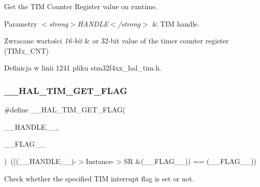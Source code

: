Get the T\+IM Counter Register value on runtime. 


\begin{DoxyParams}{Parametry}
{\em $<$strong$>$\+H\+A\+N\+D\+L\+E$<$/strong$>$} & T\+IM handle. \\
\hline
\end{DoxyParams}

\begin{DoxyRetVals}{Zwracane wartości}
{\em 16-\/bit} & or 32-\/bit value of the timer counter register (T\+I\+Mx\+\_\+\+C\+NT) \\
\hline
\end{DoxyRetVals}


Definicja w linii 1241 pliku stm32f4xx\+\_\+hal\+\_\+tim.\+h.

\mbox{\label{group___t_i_m___exported___macros_ga96d98c66ad9d85f00c148de99888ef19}} 
\subsubsection{\texorpdfstring{\+\_\+\+\_\+\+H\+A\+L\+\_\+\+T\+I\+M\+\_\+\+G\+E\+T\+\_\+\+F\+L\+AG}{\_\_HAL\_TIM\_GET\_FLAG}}
{\footnotesize\ttfamily \#define \+\_\+\+\_\+\+H\+A\+L\+\_\+\+T\+I\+M\+\_\+\+G\+E\+T\+\_\+\+F\+L\+AG(\begin{DoxyParamCaption}\item[{}]{\+\_\+\+\_\+\+H\+A\+N\+D\+L\+E\+\_\+\+\_\+,  }\item[{}]{\+\_\+\+\_\+\+F\+L\+A\+G\+\_\+\+\_\+ }\end{DoxyParamCaption})~(((\+\_\+\+\_\+\+H\+A\+N\+D\+L\+E\+\_\+\+\_\+)-\/$>$Instance-\/$>$SR \&(\+\_\+\+\_\+\+F\+L\+A\+G\+\_\+\+\_\+)) == (\+\_\+\+\_\+\+F\+L\+A\+G\+\_\+\+\_\+))}



Check whether the specified T\+IM interrupt flag is set or not. 


